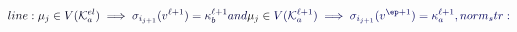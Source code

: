 \documentclass[12pt]{article}
\begin{document}
\makeatletter
\renewcommand*{\@textcolor}[3]{%
  \protect\leavevmode
  \begingroup
    \color#1{#2}#3%
  \endgroup
}
\makeatother
\begin{displaymath}
\mathcolor[RGB]{0,0,15}{line:
\mu_j\in} \mathcolor[RGB]{0,0,30}{V(\mathcal{K}^{el}_{a})\implies} \mathcolor[RGB]{0,0,45}{\sigma_{i_{j+1}}(v^{\ell+1})=\kappa_{b}^{\ell+1}\text{} \mathcolor[RGB]{0,0,60}{and} }\mu_j\in \mathcolor[RGB]{0,0,75}{V(\mathcal{K}^{\ell+1}_{a})\implies} \mathcolor[RGB]{0,0,90}{\sigma_{i_{j+1}}(v^{\ep+1})=\kappa_{a}^{\ell+1},

norm_str:}
\end{displaymath}
\end{document}
